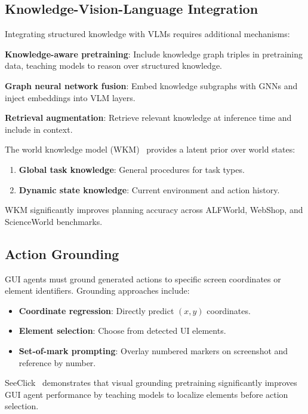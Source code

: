\documentclass[11pt]{article}
\begin{document}
\subsection{Knowledge-Vision-Language Integration}

Integrating structured knowledge with VLMs requires additional mechanisms:

\textbf{Knowledge-aware pretraining}: Include knowledge graph triples in pretraining data, teaching models to reason over structured knowledge.

\textbf{Graph neural network fusion}: Embed knowledge subgraphs with GNNs and inject embeddings into VLM layers.

\textbf{Retrieval augmentation}: Retrieve relevant knowledge at inference time and include in context.

The world knowledge model (WKM)~\cite{wkm2024} provides a latent prior over world states:

\begin{enumerate}
    \item \textbf{Global task knowledge}: General procedures for task types.
    \item \textbf{Dynamic state knowledge}: Current environment and action history.
\end{enumerate}

WKM significantly improves planning accuracy across ALFWorld, WebShop, and ScienceWorld benchmarks.

\subsection{Action Grounding}

GUI agents must ground generated actions to specific screen coordinates or element identifiers. Grounding approaches include:

\begin{itemize}
    \item \textbf{Coordinate regression}: Directly predict $(x, y)$ coordinates.
    \item \textbf{Element selection}: Choose from detected UI elements.
    \item \textbf{Set-of-mark prompting}: Overlay numbered markers on screenshot and reference by number.
\end{itemize}

SeeClick~\cite{seeclick2024} demonstrates that visual grounding pretraining significantly improves GUI agent performance by teaching models to localize elements before action selection.
\end{document}
